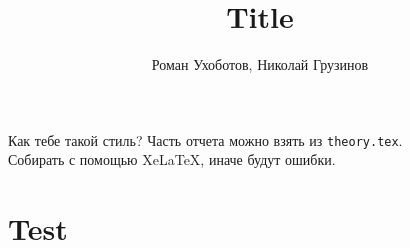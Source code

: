 \documentclass[a4paper, 12pt]{article}
\title{Title}
\author{Роман Ухоботов, Николай Грузинов}
\date{}%
\begin{document}
\maketitle

\noindent
Как тебе такой стиль?
Часть отчета можно взять из \verb|theory.tex|. \\
Собирать с помощью Xe\LaTeX, иначе будут ошибки.

\section{Test}
\blindtext
\blindtext
\end{document}
